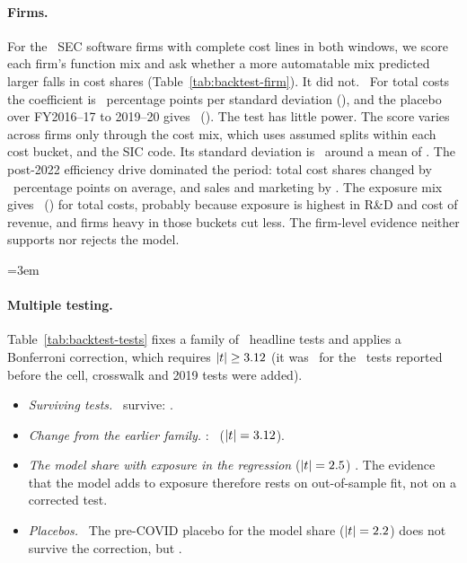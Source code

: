 

\paragraph{Firms.} For the \btNfirm\ SEC software firms with complete cost lines in both windows, we score each firm's function mix and ask whether a more automatable mix predicted larger falls in cost shares (Table~\ref{tab:backtest-firm}). It did not. \btFirmSignPhrase\ For total costs the coefficient is \btFirmMB\ percentage points per standard deviation (\btFirmMSe), and the placebo over FY2016--17 to 2019--20 gives \btFirmPlB\ (\btFirmPlSe). The test has little power. The score varies across firms only through the cost mix, which uses assumed splits within each cost bucket, and the SIC code. Its standard deviation is \btFirmSd\ around a mean of \btFirmMean. The post-2022 efficiency drive dominated the period: total cost shares changed by \btFirmTotChg\ percentage points on average, and sales and marketing by \btFirmSmChg. The exposure mix gives \btFirmEB\ (\btFirmESe) for total costs, probably because exposure is highest in R\&D and cost of revenue, and firms heavy in those buckets cut less. The firm-level evidence neither supports nor rejects the model.



\begingroup\emergencystretch=3em
\paragraph{Multiple testing.} Table~\ref{tab:backtest-tests} fixes a family of \btNtests\ headline tests and applies a Bonferroni correction, which requires $|t|\ge3.12$ (it was \btTcritPrev\ for the \btNtestsPrev\ tests reported before the cell, crosswalk and 2019 tests were added).
\begin{itemize}
\item \emph{Surviving tests.} \btNsurvive\ survive: \btSurvivorsList.
\item \emph{Change from the earlier family.} \btSurvivalChangePhrase: \btEAlonePhrase\ ($|t|=3.12$).
\item \emph{The model share with exposure in the regression} ($|t|=2.5$) \btJointSurvives. The evidence that the model adds to exposure therefore rests on out-of-sample fit, not on a corrected test.
\item \emph{Placebos.} \btPlaceboSurvive\ The pre-COVID placebo for the model share ($|t|=2.2$) does not survive the correction, but \btPrePlaceboPhrase.
\end{itemize}
\endgroup

